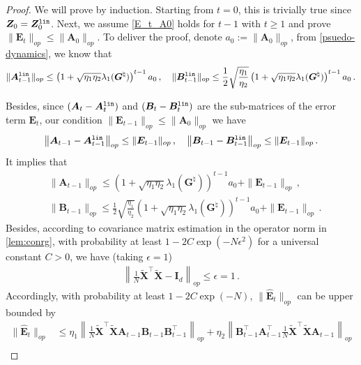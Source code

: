 \begin{proof}
We will prove by induction. Starting from $t=0$, this is trivially true since $\bm Z_0 = \bm Z^{\tt lin}_0$. Next, we assume \cref{E_t_A0} holds for $t-1$ with $t\geq 1$ and prove $\|\bm E_t\|_{op} \leq \|\bm A_0\|_{op}$.
To deliver the proof, denote $a_0:=\|\bm A_0\|_{op}$, from \cref{psuedo-dynamics}, we know that 
\begin{equation}\label{eq:normABt}
 \|\bm A^{\tt lin}_{t-1}\|_{op} \leq \left(1+\sqrt{\eta_1 \eta_2}\lambda_1({\bm G}^{\natural})\right)^{t-1} a_0\,, \quad   \|\bm B^{\tt lin}_{t-1}\|_{op} \leq \frac{1}{2}\sqrt{\frac{\eta_1}{\eta_2}}\left(1+\sqrt{\eta_1 \eta_2}\lambda_1({\bm G}^{\natural})\right)^{t-1} a_0\,.
\end{equation}

Besides, since $(\bm A_t -\bm A^{\tt lin}_t)$ and $(\bm B_t -\bm B^{\tt lin}_t)$ are the sub-matrices of the error term $\bm E_t$, our condition $\|\bm E_{t-1}\|_{op} \leq \|\bm A_0\|_{op}$ we have 
\begin{align}\label{AB_t_diff}
    \left\|
        \bm A_{t-1} -\bm A^{\tt lin}_{t-1}
    \right\|_{op} \leq \|\bm E_{t-1}\|_{op}\,,\quad
    \left\|
        \bm B_{t-1} -\bm B^{\tt lin}_{t-1}
    \right\|_{op} \leq \|\bm E_{t-1}\|_{op}\, .
\end{align}
It implies that
\begin{equation}\label{A-B-pseudo-upper-bound}
\begin{split}
    & \|\bm A_{t-1}\|_{op} \leq \left(1+\sqrt{\eta_1 \eta_2}\lambda_1({\bm G}^{\natural})\right)^{t-1} a_0 + \|\bm E_{t-1}\|_{op}\,, \\ 
    & \|\bm B_{t-1}\|_{op} \leq \frac{1}{2}\sqrt{\frac{\eta_1}{\eta_2}}\left(1+\sqrt{\eta_1 \eta_2}\lambda_1({\bm G}^{\natural})\right)^{t-1} a_0 + \|\bm E_{t-1}\|_{op}\,.
\end{split}
\end{equation}
Besides, according to covariance matrix estimation in the operator norm in \cref{lem:conrg}, with probability at least $1-2C\exp(-N{\epsilon}^2)$ for a universal constant $C>0$, we have (taking $\epsilon=1$)
\begin{align}\label{eq:concenXX}
    \left\|\frac{1}{N}\widetilde{\bm X}^{\!\top}\widetilde{\bm X} - \bm I_d\right\|_{op} \leq \epsilon = 1\,.
\end{align} 
Accordingly, with probability at least $1-2C\exp(-N)$, $\|\widehat{\bm E}_t\|_{op}$ can be upper bounded by
\begin{align*}
    \|\widehat{\bm E}_t\|_{op} & \leq \eta_1 \left\|\frac{1}{N}\widetilde{\bm X}^{\!\top}\widetilde{\bm X}\bm A_{t-1} \bm B_{t-1} \bm B_{t-1}^{\!\top}\right\|_{op}+ \eta_2 \left\|\bm B_{t-1}^{\!\top}\bm A_{t-1}^{\!\top}\frac{1}{N}\widetilde{\bm X}^{\!\top}\widetilde{\bm X}\bm A_{t-1}\right\|_{op}\\

\end{align*}
\end{proof}
